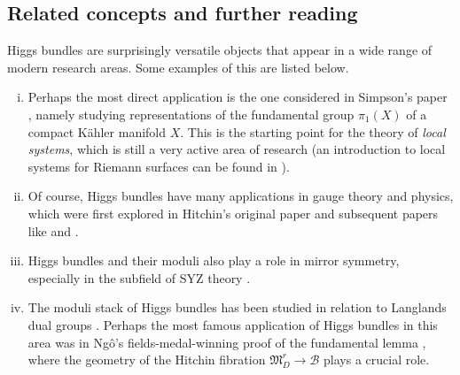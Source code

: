 \documentclass[10pt]{amsart}
\numberwithin{equation}{section}
\def\~#1{\mathscr{#1}}
\renewcommand{\frak}[1]{\mathfrak{#1}}
\theoremstyle{plain}
\theoremstyle{definition}
\theoremstyle{remark}
\begin{document}
\subsection{Related concepts and further reading}
Higgs bundles are surprisingly versatile objects that appear in a wide range of modern research areas. Some examples of this are listed below.
\begin{enumerate}[(i)]
    \item Perhaps the most direct application is the one considered in Simpson's paper \cite{simpson92}, namely studying representations of the fundamental group $\pi_1(X)$ of a compact K\"ahler manifold $X$. This is the starting point for the theory of \emph{local systems}, which is still a very active area of research (an introduction to local systems for Riemann surfaces can be found in \cite{wentworth2015}).
    \item Of course, Higgs bundles have many applications in gauge theory and physics, which were first explored in Hitchin's original paper \cite{hitchin1987A} and subsequent papers like \cite{hitchin92} and \cite{hitchin1987B}.
    \item Higgs bundles and their moduli also play a role in mirror symmetry, especially in the subfield of SYZ theory \cite{BGG2007,HOP2023}.
    \item The moduli stack of Higgs bundles has been studied in relation to Langlands dual groups \cite{derryberry2020}. Perhaps the most famous application of Higgs bundles in this area was in Ng\^o's fields-medal-winning proof of the fundamental lemma \cite{ngo2006}, where the geometry of the Hitchin fibration $\frak{M}_D^r \to \~B$ plays a crucial role.
\end{enumerate}

 
\end{document}
